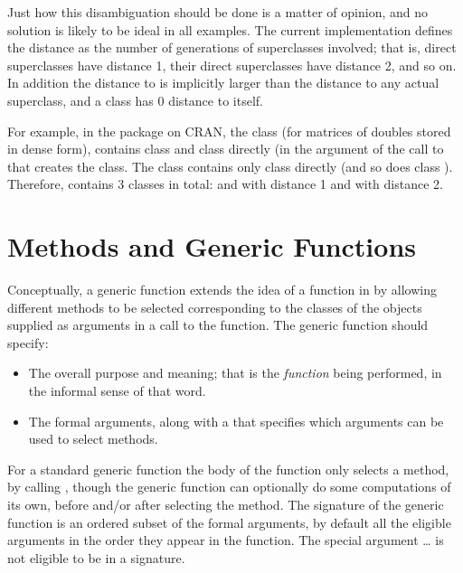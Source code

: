 \documentclass[11pt]{article}
\begin{document}
Just how this disambiguation should be done is a matter of opinion, and no solution is likely to be ideal in all examples.
The current \R{} implementation defines the distance as the number of generations of superclasses involved; that is, direct superclasses have distance 1, their direct superclasses have distance 2, and so on.
In addition the distance to  is implicitly larger than the distance to any actual superclass, and a class has 0 distance to itself.

For example, in the  package on CRAN, the class  (for matrices of doubles stored in dense form), contains class  and class  directly (in the  argument of the call to  that creates the  class.
The class  contains only class  directly (and so does class ).  Therefore,  contains 3 classes in total:  and  with distance 1 and  with distance 2.


\section{Methods and Generic Functions}
\label{sec:meth-gener-funct}

Conceptually, a generic function extends the idea of a function in \R{} by allowing different methods to be selected corresponding to the classes of the objects supplied as arguments in a call to the function.
The generic function should specify:
\begin{itemize}
\item The overall purpose and meaning; that is the \emph{function} being performed, in the informal sense of that word.
\item The formal arguments, along with a  that specifies which arguments can be used to select methods.
\end{itemize}
For a standard generic function the body of the function only selects a method, by calling , though the generic function can optionally do some computations of its own, before and/or after selecting the method.
The signature of the generic function is an ordered subset of the formal arguments, by default all the eligible arguments in the order they appear in the function.
The special argument \dots{} is not eligible to be in a signature.
\end{document}

